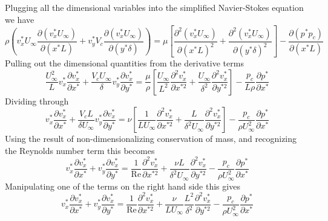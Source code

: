 Plugging all the dimensional variables into the simplified Navier-Stokes equation we have
\begin{equation*}
  \rho\left(v_{x}^{*}U_{\infty}\frac{\partial(v_{x}^{*}U_{\infty})}{\partial(x^{*}L)}+v_{y}^{*}V_{c}\frac{\partial(v_{x}^{*}U_{\infty})}{\partial(y^{*}\delta)}\right)=\mu\left[\frac{\partial^{2}(v_{x}^{*}U_{\infty})}{\partial(x^{*}L)^{2}}+\frac{\partial^{2}(v_{x}^{*}U_{\infty})}{\partial{}(y^{*}\delta)^{2}}\right]-\frac{\partial(p^{*}p_{c})}{\partial(x^{*}L)}
\end{equation*}
Pulling out the dimensional quantities from the derivative terms
\begin{equation*}
  \frac{U_{\infty}^{2}}{L}v_{x}^{*}\frac{\partial{}v_{x}^{*}}{\partial{}x^{*}}+\frac{V_{c}U_{\infty}}{\delta}v_{y}^{*}\frac{\partial{}v_{x}^{*}}{\partial{}y^{*}}=\frac{\mu}{\rho}\left[\frac{U_{\infty}}{L^{2}}\frac{\partial^{2}v_{x}^{*}}{\partial{}x^{*2}}+\frac{U_{\infty}}{\delta^{2}}\frac{\partial^{2}v_{x}^{*}}{\partial{}y^{*2}}\right]-\frac{p_{c}}{L\rho}\frac{\partial{}p^{*}}{\partial{}x^{*}}
\end{equation*}
Dividing through
\begin{equation*}
  v_{x}^{*}\frac{\partial{}v_{x}^{*}}{\partial{}x^{*}}+\frac{V_{c}L}{\delta U_{\infty}}v_{y}^{*}\frac{\partial{}v_{x}^{*}}{\partial{}y^{*}}=\nu\left[\frac{1}{LU_{\infty}}\frac{\partial^{2}v_{x}^{*}}{\partial{}x^{*2}}+\frac{L}{\delta^{2}U_{\infty}}\frac{\partial^{2}v_{x}^{*}}{\partial{}y^{*2}}\right]-\frac{p_{c}}{\rho{}U_{\infty}^{2}}\frac{\partial{}p^{*}}{\partial{}x^{*}}
\end{equation*}
Using the result of non-dimensionalizing conservation of mass, and recognizing the Reynolds number term this becomes
\begin{equation*}
  v_{x}^{*}\frac{\partial{}v_{x}^{*}}{\partial{}x^{*}}+v_{y}^{*}\frac{\partial{}v_{x}^{*}}{\partial{}y^{*}}=\frac{1}{\text{Re}}\frac{\partial^{2}v_{x}^{*}}{\partial{}x^{*2}}+\frac{\nu{}L}{\delta^{2}U_{\infty}}\frac{\partial^{2}v_{x}^{*}}{\partial{}y^{*2}}-\frac{p_{c}}{\rho{}U_{\infty}^{2}}\frac{\partial{}p^{*}}{\partial{}x^{*}}
\end{equation*}
Manipulating one of the terms on the right hand side this gives
\begin{equation*}
  v_{x}^{*}\frac{\partial{}v_{x}^{*}}{\partial{}x^{*}}+v_{y}^{*}\frac{\partial{}v_{x}^{*}}{\partial{}y^{*}}=\frac{1}{\text{Re}}\frac{\partial^{2}v_{x}^{*}}{\partial{}x^{*2}}+\frac{\nu}{LU_{\infty}}\frac{L^{2}}{\delta^{2}}\frac{\partial^{2}v_{x}^{*}}{\partial{}y^{*2}}-\frac{p_{c}}{\rho{}U_{\infty}^{2}}\frac{\partial{}p^{*}}{\partial{}x^{*}}
\end{equation*}
